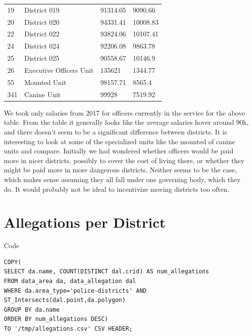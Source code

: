 \documentclass{article}
\begin{document}
\begin{table}[h]
\begin{tabular}{|l|l|l|l|}
19         & District 019                                          & 91314.05        & 9090.66     \\
20         & District 020                                          & 94331.41        & 10008.83    \\
22         & District 022                                          & 93824.06        & 10107.41    \\
24         & District 024                                          & 92206.08        & 9863.78     \\
25         & District 025                                          & 90558.67        & 10146.9     \\
26         & Executive Officers Unit                               & 135621          & 1344.77     \\
55         & Mounted Unit                                          & 98157.71        & 8565.4      \\
341        & Canine Unit                                           & 99928           & 7519.92        
\\
\hline
\end{tabular}
\end{table}

We took only salaries from 2017 for officers currently in the service for the above table. From the table it generally looks like the average salaries hover around 90k, and there doesn't seem to be a significant difference between districts. It is interesting to look at some of the specialized units like the mounted of canine units and compare. Initially we had wondered whether officers would be paid more in nicer districts, possibly to cover the cost of living there, or whether they might be paid more in more dangerous districts. Neither seems to be the case, which makes sense assuming they all fall under one governing body, which they do. It would probably not be ideal to incentivize moving districts too often.


\FloatBarrier
\section{Allegations per District}

\begin{center}
Code
\end{center}
\begin{lstlisting}[frame=single]
COPY(
SELECT da.name, COUNT(DISTINCT dal.crid) AS num_allegations
FROM data_area da, data_allegation dal
WHERE da.area_type='police-districts' AND ST_Intersects(dal.point,da.polygon)
GROUP BY da.name
ORDER BY num_allegations DESC)
TO '/tmp/allegations.csv' CSV HEADER;
\end{lstlisting}
\end{document}
